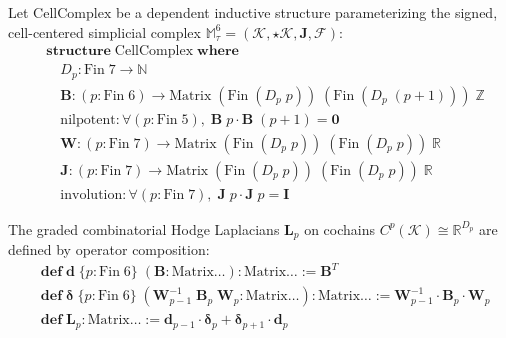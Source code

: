 \documentclass[
    12pt,
    a4paper,
    headings=normal,
    twoside=false,
    open=any,
    parskip=half
]{scrbook}
\begin{document}
\begin{physdefinition}
Let $\mathrm{CellComplex}$ be a dependent inductive structure parameterizing the signed, cell-centered simplicial complex $\mathbb{M}_\tau^6 = (\mathcal{K}, \star\mathcal{K}, \mathbf{J}, \mathscr{F})$:
\begin{align*}
&\mathbf{structure}\;\mathrm{CellComplex}\;\mathbf{where} \\
&\quad D_p \colon \mathrm{Fin}\;7 \to \mathbb{N} \\
&\quad \mathbf{B} \colon (p \colon \mathrm{Fin}\;6) \to \mathrm{Matrix}\;(\mathrm{Fin}\;(D_p\;p))\;(\mathrm{Fin}\;(D_p\;(p+1)))\;\mathbb{Z} \\
&\quad \mathrm{nilpotent} \colon \forall (p \colon \mathrm{Fin}\;5), \;\mathbf{B}\;p \cdot \mathbf{B}\;(p+1) = \mathbf{0} \\
&\quad \mathbf{W} \colon (p \colon \mathrm{Fin}\;7) \to \mathrm{Matrix}\;(\mathrm{Fin}\;(D_p\;p))\;(\mathrm{Fin}\;(D_p\;p))\;\mathbb{R} \\
&\quad \mathbf{J} \colon (p \colon \mathrm{Fin}\;7) \to \mathrm{Matrix}\;(\mathrm{Fin}\;(D_p\;p))\;(\mathrm{Fin}\;(D_p\;p))\;\mathbb{R} \\
&\quad \mathrm{involution} \colon \forall (p \colon \mathrm{Fin}\;7), \;\mathbf{J}\;p \cdot \mathbf{J}\;p = \mathbf{I}
\end{align*}
\end{physdefinition}

\begin{physdefinition}
The graded combinatorial Hodge Laplacians $\mathbf{L}_p$ on cochains $C^p(\mathcal{K}) \cong \mathbb{R}^{D_p}$ are defined by operator composition:
\begin{align*}
&\mathbf{def}\;\mathbf{d}\;\{p \colon \mathrm{Fin}\;6\}\;(\mathbf{B} \colon \mathrm{Matrix}\dots) \colon \mathrm{Matrix}\dots := \mathbf{B}^T \\
&\mathbf{def}\;\boldsymbol{\delta}\;\{p \colon \mathrm{Fin}\;6\}\;(\mathbf{W}_{p-1}^{-1}\;\mathbf{B}_p\;\mathbf{W}_p \colon \mathrm{Matrix}\dots) \colon \mathrm{Matrix}\dots := \mathbf{W}_{p-1}^{-1} \cdot \mathbf{B}_p \cdot \mathbf{W}_p \\
&\mathbf{def}\;\mathbf{L}_p \colon \mathrm{Matrix}\dots := \mathbf{d}_{p-1} \cdot \boldsymbol{\delta}_p + \boldsymbol{\delta}_{p+1} \cdot \mathbf{d}_p
\end{align*}
\end{physdefinition}
\end{document}

